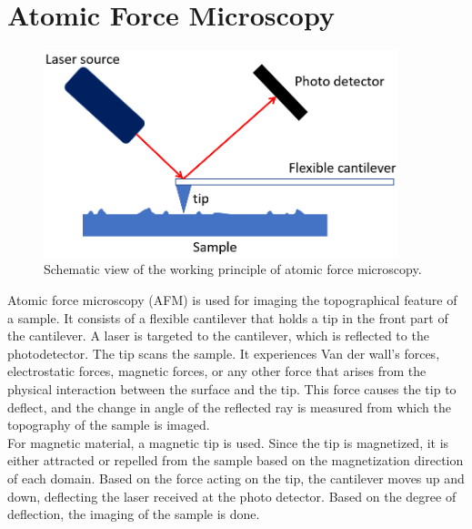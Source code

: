 \documentclass[12pt,a4paper,bold]{thesis}
\theoremstyle{thm}
\theoremstyle{definition}
\begin{document}
\section{Atomic Force Microscopy}
\begin{figure}[H]
	\centering
   \includegraphics[height=6cm]{Images/53.png} 
   \caption{Schematic view of the working principle of atomic force microscopy.}
\end{figure}
\indent \indent\indent Atomic force microscopy (AFM) is used for imaging the topographical feature of a sample. It consists of a flexible cantilever that holds a tip in the front part of the cantilever. A laser is targeted to the cantilever, which is reflected to the photodetector. The tip scans the sample. It experiences Van der wall's forces, electrostatic forces, magnetic forces, or any other force that arises from the physical interaction between the surface and the tip. This force causes the tip to deflect, and the change in angle of the reflected ray is measured from which the topography of the sample is imaged.\\
\indent \indent For magnetic material, a magnetic tip is used. Since the tip is magnetized, it is either attracted or repelled from the sample based on the magnetization direction of each domain. Based on the force acting on the tip, the cantilever moves up and down, deflecting the laser received at the photo detector. Based on the degree of deflection, the imaging of the sample is done.
\end{document}
